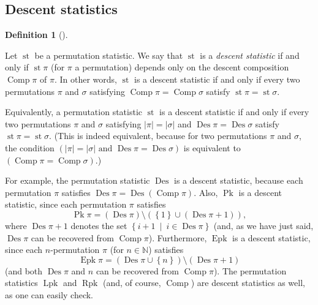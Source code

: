 \documentclass[numbers=enddot,12pt,final,onecolumn,notitlepage]{scrartcl}%
\theoremstyle{definition}
\newtheorem{defi}[theo]{Definition}
\newenvironment{definition}[1][]
{\begin{defi}[#1]\begin{leftbar}}
{\end{leftbar}\end{defi}}
\begin{document}
\subsection{Descent statistics}

\begin{definition}
Let $\operatorname*{st}$ be a permutation statistic. We say that
$\operatorname*{st}$ is a \textit{descent statistic} if and only if
$\operatorname*{st}\pi$ (for $\pi$ a permutation) depends only on the descent
composition $\operatorname*{Comp}\pi$ of $\pi$. In other words,
$\operatorname*{st}$ is a descent statistic if and only if every two
permutations $\pi$ and $\sigma$ satisfying $\operatorname*{Comp}%
\pi=\operatorname*{Comp}\sigma$ satisfy $\operatorname*{st}\pi
=\operatorname*{st}\sigma$.
\end{definition}

Equivalently, a permutation statistic $\operatorname*{st}$ is a descent
statistic if and only if every two permutations $\pi$ and $\sigma$ satisfying
$\left\vert \pi\right\vert =\left\vert \sigma\right\vert $ and
$\operatorname*{Des}\pi=\operatorname*{Des}\sigma$ satisfy $\operatorname*{st}%
\pi=\operatorname*{st}\sigma$. (This is indeed equivalent, because for two
permutations $\pi$ and $\sigma$, the condition $\left(  \left\vert
\pi\right\vert =\left\vert \sigma\right\vert \text{ and }\operatorname*{Des}%
\pi=\operatorname*{Des}\sigma\right)  $ is equivalent to $\left(
\operatorname*{Comp}\pi=\operatorname*{Comp}\sigma\right)  $.)

For example, the permutation statistic $\operatorname*{Des}$ is a descent
statistic, because each permutation $\pi$ satisfies $\operatorname*{Des}%
\pi=\operatorname*{Des}\left(  \operatorname*{Comp}\pi\right)  $. Also,
$\operatorname*{Pk}$ is a descent statistic, since each permutation $\pi$
satisfies%
\[
\operatorname*{Pk}\pi=\left(  \operatorname*{Des}\pi\right)  \setminus\left(
\left\{  1\right\}  \cup\left(  \operatorname*{Des}\pi+1\right)  \right)  ,
\]
where $\operatorname*{Des}\pi+1$ denotes the set $\left\{  i+1\ \mid
\ i\in\operatorname*{Des}\pi\right\}  $ (and, as we have just said,
$\operatorname*{Des}\pi$ can be recovered from $\operatorname*{Comp}\pi$).
Furthermore, $\operatorname*{Epk}$ is a descent statistic, since each
$n$-permutation $\pi$ (for $n\in\mathbb{N}$) satisfies%
\[
\operatorname*{Epk}\pi=\left(  \operatorname*{Des}\pi\cup\left\{  n\right\}
\right)  \setminus\left(  \operatorname*{Des}\pi+1\right)
\]
(and both $\operatorname*{Des}\pi$ and $n$ can be recovered from
$\operatorname*{Comp}\pi$). The permutation statistics $\operatorname*{Lpk}$
and $\operatorname*{Rpk}$ (and, of course, $\operatorname*{Comp}$) are descent
statistics as well, as one can easily check.
\end{document}
